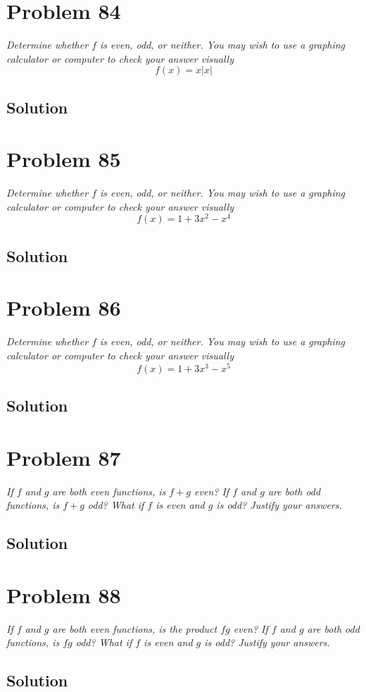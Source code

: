 \documentclass[11pt]{article}
\newcommand{\soln}{\subsection*}
\newcommand{\qn}{\textit}
\begin{document}
\section*{Problem 84}

\qn{Determine whether $f$ is even, odd, or neither. You may wish to use a graphing calculator or computer to check your answer visually $$f(x)=x|x|$$}

\soln{Solution}

\section*{Problem 85}

\qn{Determine whether $f$ is even, odd, or neither. You may wish to use a graphing calculator or computer to check your answer visually $$f(x)=1+3x^2-x^4$$}

\soln{Solution}

\section*{Problem 86}

\qn{Determine whether $f$ is even, odd, or neither. You may wish to use a graphing calculator or computer to check your answer visually $$f(x)=1+3x^3-x^5$$}

\soln{Solution}

\section*{Problem 87}

\qn{If $f$ and $g$ are both even functions, is $f+g$ even? If $f$ and $g$ are both odd functions, is $f+g$ odd? What if $f$ is even and $g$ is odd? Justify your answers.}

\soln{Solution}

\section*{Problem 88}

\qn{If $f$ and $g$ are both even functions, is the product $fg$ even? If $f$ and $g$ are both odd functions, is $fg$ odd? What if $f$ is even and $g$ is odd? Justify your answers.}

\soln{Solution}
\end{document}
